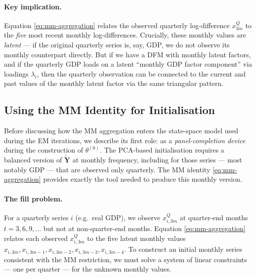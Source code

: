 \documentclass[11pt, a4paper, oneside]{article}
\begin{document}
\paragraph{Key implication.}
Equation \eqref{eq:mm-aggregation} relates the observed quarterly
log-difference $x^Q_{3m}$ to the \emph{five} most recent monthly
log-differences. Crucially, these monthly values are \emph{latent} —
if the original quarterly series is, say, GDP, we do not observe its
monthly counterpart directly. But if we have a DFM with monthly
latent factors, and if the quarterly GDP loads on a latent ``monthly
GDP factor component'' via loadings $\lambda_i$, then the quarterly
observation can be connected to the current and past values of the
monthly latent factor via the same triangular pattern.

\subsection{Using the MM Identity for Initialisation}
\label{subsec:mm-init}

Before discussing how the MM aggregation enters the state-space model
used during the EM iterations, we describe its first role: as a
\emph{panel-completion device} during the construction of
$\theta^{(0)}$. The PCA-based initialisation requires a balanced
version of $\widetilde{\mathbf{Y}}$ at monthly frequency, including
for those series — most notably GDP — that are observed only
quarterly. The MM identity \eqref{eq:mm-aggregation} provides exactly
the tool needed to produce this monthly version.

\paragraph{The fill problem.}
For a quarterly series $i$ (e.g.\ real GDP), we observe
$x^Q_{i, 3m}$ at quarter-end months $t = 3, 6, 9, \ldots$ but not at
non-quarter-end months. Equation \eqref{eq:mm-aggregation} relates
each observed $x^Q_{i, 3m}$ to the five latent monthly values
$x_{i, 3m}, x_{i, 3m-1}, x_{i, 3m-2}, x_{i, 3m-3}, x_{i, 3m-4}$. To
construct an initial monthly series consistent with the MM
restriction, we must solve a system of linear constraints — one per
quarter — for the unknown monthly values.
\end{document}
